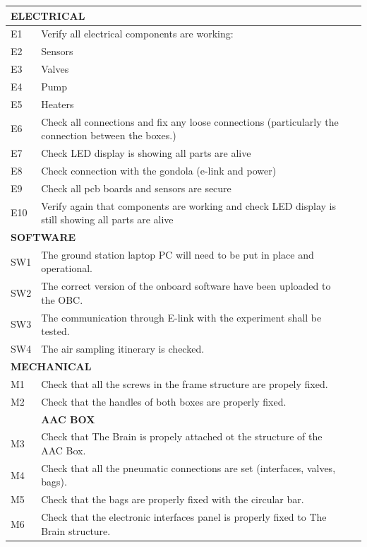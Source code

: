 \documentclass[a4paper,12pt,twoside]{article}
\begin{document}
\begin{appendices}
\begin{longtable} {|m{}|m{}|m{}|}
\hline
\multicolumn{2}{|l|}{ \textbf{ELECTRICAL} } & \\
\hline
E1 & Verify all electrical components are working: & \\
\hline
E2 & Sensors & \\
\hline
E3 & Valves & \\
\hline
E4 & Pump & \\
\hline
E5 & Heaters & \\
\hline
E6 & Check all connections and fix any loose connections (particularly the connection between the boxes.) & \\
\hline
E7 & Check LED display is showing all parts are alive & \\
\hline
E8 & Check connection with the gondola (e-link and power) & \\
\hline
E9 & Check all pcb boards and sensors are secure & \\
\hline
E10 & Verify again that components are working and check LED display is still showing all parts are alive & \\
\hline
\multicolumn{2}{|l|}{ \textbf{SOFTWARE} } & \\
\hline
SW1 & The ground station laptop PC will need to be put in place and operational. & \\
\hline
SW2 & The correct version of the onboard software have been uploaded to the OBC. & \\
\hline
SW3 & The communication through E-link with the experiment shall be tested. & \\
\hline
SW4 & The air sampling itinerary is checked. & \\
\hline
\multicolumn{2}{|l|}{ \textbf{MECHANICAL} } & \\
\hline
M1 & Check that all the screws in the frame structure are propely fixed. & \\
\hline
M2 & Check that the handles of both boxes are properly fixed. & \\
\hline
& \textbf{AAC BOX} & \\
\hline
M3 & Check that The Brain is propely attached ot the structure of the AAC Box. & \\
\hline
M4 & Check that all the pneumatic connections are set (interfaces, valves, bags). & \\
\hline
M5 & Check that the bags are properly fixed with the circular bar. & \\
\hline
M6 & Check that the electronic interfaces panel is properly fixed to The Brain structure. & \\

\end{longtable}
\end{appendices}
\end{document}

